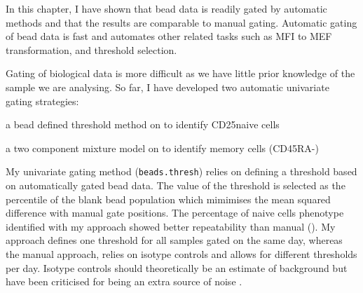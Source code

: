 %
In this chapter, I have shown that bead data is readily gated by automatic methods and that the results are comparable to manual gating.
Automatic gating of bead data is fast and automates other related tasks such as MFI to MEF transformation, and threshold selection.

Gating of biological data is more difficult as we have little prior knowledge of the sample we are analysing.
So far, I have developed two automatic univariate gating strategies:
\begin{itemise}
\item a bead defined threshold method on  to identify CD25\positive naive cells
\item a two component mixture model on  to identify memory cells (CD45RA-)
\end{itemise}

My  univariate gating method (\texttt{beads.thresh}) relies on defining a threshold based on automatically gated bead data.
The value of the threshold is selected as the percentile of the blank bead population which mimimises the mean squared difference with manual gate positions.
The percentage of naive \positive cells phenotype identified with my approach showed better repeatability than manual ().
My approach defines one threshold for all samples gated on the same day,
whereas the manual approach, relies on isotype controls and allows for different thresholds per day.
Isotype controls should theoretically be an estimate of background but have been criticised for being an extra source of noise \citep{OGorman:1999vd,Maecker:2006ft}.

